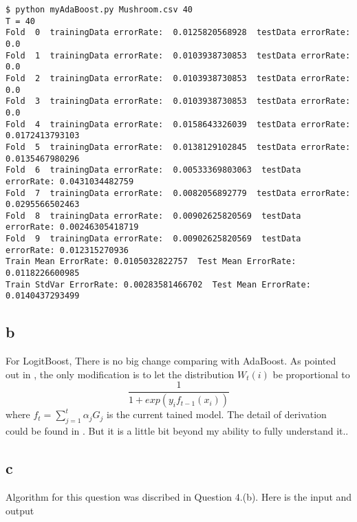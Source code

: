 \documentclass[12pt]{amsart}
\begin{document}
\begin{verbatim}
$ python myAdaBoost.py Mushroom.csv 40
T = 40
Fold  0  trainingData errorRate:  0.0125820568928  testData errorRate: 0.0
Fold  1  trainingData errorRate:  0.0103938730853  testData errorRate: 0.0
Fold  2  trainingData errorRate:  0.0103938730853  testData errorRate: 0.0
Fold  3  trainingData errorRate:  0.0103938730853  testData errorRate: 0.0
Fold  4  trainingData errorRate:  0.0158643326039  testData errorRate: 0.0172413793103
Fold  5  trainingData errorRate:  0.0138129102845  testData errorRate: 0.0135467980296
Fold  6  trainingData errorRate:  0.00533369803063  testData errorRate: 0.0431034482759
Fold  7  trainingData errorRate:  0.0082056892779  testData errorRate: 0.0295566502463
Fold  8  trainingData errorRate:  0.00902625820569  testData errorRate: 0.00246305418719
Fold  9  trainingData errorRate:  0.00902625820569  testData errorRate: 0.012315270936
Train Mean ErrorRate: 0.0105032822757  Test Mean ErrorRate: 0.0118226600985
Train StdVar ErrorRate: 0.00283581466702  Test Mean ErrorRate: 0.0140437293499

\end{verbatim}

\subsection*{b}
For LogitBoost, There is no big change comparing with AdaBoost. As pointed
out in \cite{overview}, the only modification is to let the 
distribution $W_t(i)$ be proportional to
$$
	\frac{1}{1 + exp(y_i f_{t-1}(x_i))}
$$ 
where $f_t = \sum_{j=1}^t \alpha_j G_j$ is the current tained model.
The detail of derivation could be found in \cite{detail}. But it
is a little bit beyond my ability to fully understand it..

\subsection*{c}
Algorithm for this question was discribed in Question 4.(b).
Here is the input and output
\end{document}
